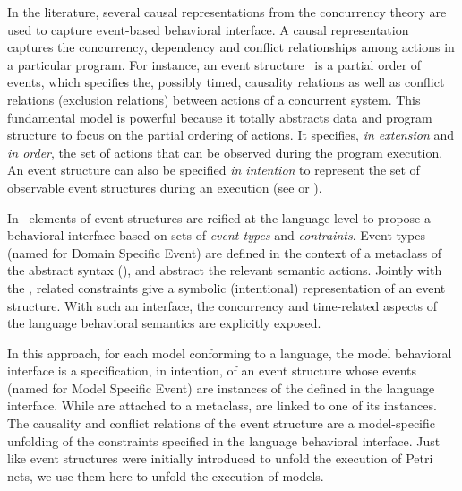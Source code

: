 In the literature, several causal representations from the concurrency theory are used to capture event-based behavioral interface. A causal representation captures the concurrency, dependency and conflict relationships among actions in a particular program. For instance, an event structure~\cite{eventStructures} is a partial order of events, which specifies the, possibly timed, causality relations as well as conflict relations (\ie exclusion relations) between actions of a concurrent system. This fundamental model is powerful because it totally abstracts data and program structure to focus on the partial ordering of actions. It specifies, \emph{in extension} and \emph{in order}, the set of actions that can be observed during the program execution. An event structure can also be specified \emph{in intention} to represent the set of observable event structures during an execution (see \eg\cite{tr:ccsl} or \cite{tagmachine}).
	    	
In~\cite{sle13-combemale} elements of event structures are reified at the language level to propose a behavioral interface based on sets of \emph{event types} and \emph{contraints}. Event types (named \dse for Domain Specific Event) are defined in the context of a metaclass of the abstract syntax (\as), and abstract the relevant semantic actions. Jointly with the \dse, related constraints give a symbolic (intentional) representation of an event structure. With such an interface, the concurrency and time-related aspects of the language behavioral semantics are explicitly exposed.

In this approach, for each model conforming to a language, the model behavioral interface is a specification, in intention, of an event structure whose events (named \mse for Model Specific Event) are instances of the \dse defined in the language interface. While \dse are attached to a metaclass, \mse are linked to one of its instances. The causality and conflict relations of the event structure are a model-specific unfolding of the constraints specified in the language behavioral interface. Just like event structures were initially introduced to unfold the execution of Petri nets, we use them here to unfold the execution of models.	    	

	    	
	    	
	    				
